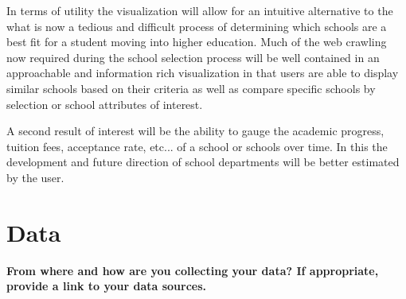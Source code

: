 \documentclass[11pt, a4paper]{article}
\begin{document}
In terms of utility the visualization will allow for an intuitive alternative to the what is now a tedious and difficult process of determining which schools are a best fit for a student moving into higher education. Much of the web crawling now required during the school selection process will be well contained in an approachable and information rich visualization in that users are able to display similar schools based on their criteria as well as compare specific schools by selection or school attributes of interest.

A second result of interest will be the ability to gauge the academic progress, tuition fees, acceptance rate, etc... of a school or schools over time. In this the development and future direction of school departments will be better estimated by the user. 

\section{Data}\textbf{ From where and how are you collecting your data? If appropriate, provide a link to your data sources.}
\end{document}
